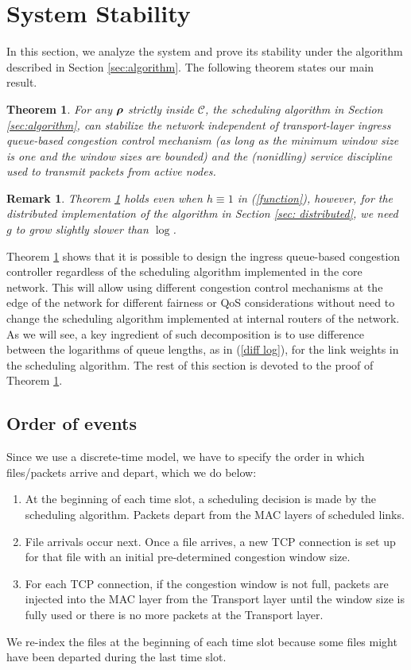 \documentclass[10pt,onecolumn,draftclsnofoot,journal]{IEEEtran}
\newtheorem{theorem}{Theorem}
\newtheorem{remark}{Remark}
\newcommand{\brho}{\mbox{\boldmath$\rho$}}
\begin{document}
\section{System Stability} \label{sec:proof}
In this section, we analyze the system and prove its stability under the algorithm described in Section \ref{sec:algorithm}. The following theorem states our main result.
\begin{theorem}\label{theorem}
For any $\brho$ strictly inside $\mathcal{C}$, the scheduling algorithm in Section \ref{sec:algorithm},
can stabilize the network independent
of transport-layer ingress queue-based congestion control mechanism (as long as the minimum window
size is one and the window sizes are bounded) and the (nonidling)
service discipline used to transmit packets from active
nodes.
\end{theorem}
\begin{remark}
Theorem \ref{theorem} holds even when $h \equiv 1$ in (\ref{function}), however, for the distributed implementation of the algorithm in Section \ref{sec: distributed}, we need $g$ to grow slightly slower than $\log$.
\end{remark}
Theorem \ref{theorem} shows that it is possible to design the ingress queue-based congestion controller regardless of the scheduling algorithm implemented in the core network. This will allow using different congestion control mechanisms at the edge of the network for different fairness or QoS considerations without need to change the scheduling algorithm implemented at internal routers of the network. As we will see, a key ingredient of such decomposition is to use difference between the logarithms of queue lengths, as in (\ref{diff log}), for the link weights in the scheduling algorithm. The rest of this section is devoted to the proof of Theorem \ref{theorem}.
\subsection*{Order of events}
Since we use a discrete-time model, we have to specify the order in which files/packets arrive and depart, which we do below:
\begin{enumerate}

\item At the beginning of each time slot, a scheduling decision is made by the scheduling algorithm. Packets depart from the MAC layers of scheduled links.

\item File arrivals occur next. Once a file arrives, a new TCP connection is set up for that file with an initial pre-determined congestion window size.

\item For each TCP connection, if the congestion window is not full, packets are injected into the MAC layer from the Transport layer until the window size is fully used or there is no more packets at the Transport layer.
\end{enumerate}
We re-index the files at the beginning of each time slot because some files might have been departed during the last time
slot.
\end{document}
